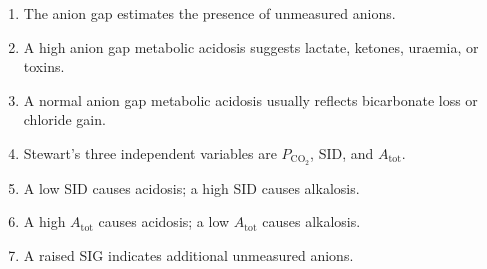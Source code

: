 \documentclass[11pt,a4paper]{article}
\begin{document}
\begin{enumerate}[label=\arabic*.]
    \item The anion gap estimates the presence of unmeasured anions.
    \item A high anion gap metabolic acidosis suggests lactate, ketones, uraemia, or toxins.
    \item A normal anion gap metabolic acidosis usually reflects bicarbonate loss or chloride gain.
    \item Stewart's three independent variables are \(P_{\mathrm{CO_2}}\), SID, and \(A_{\mathrm{tot}}\).
    \item A low SID causes acidosis; a high SID causes alkalosis.
    \item A high \(A_{\mathrm{tot}}\) causes acidosis; a low \(A_{\mathrm{tot}}\) causes alkalosis.
    \item A raised SIG indicates additional unmeasured anions.
\end{enumerate}
\end{document}
